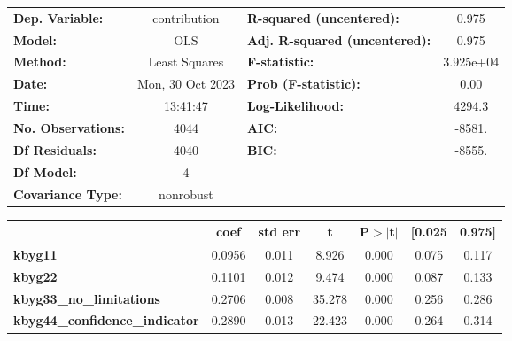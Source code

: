 \begin{center}
\begin{tabular}{lclc}
\toprule
\textbf{Dep. Variable:}                &   contribution   & \textbf{  R-squared (uncentered):}      &     0.975   \\
\textbf{Model:}                        &       OLS        & \textbf{  Adj. R-squared (uncentered):} &     0.975   \\
\textbf{Method:}                       &  Least Squares   & \textbf{  F-statistic:       }          & 3.925e+04   \\
\textbf{Date:}                         & Mon, 30 Oct 2023 & \textbf{  Prob (F-statistic):}          &     0.00    \\
\textbf{Time:}                         &     13:41:47     & \textbf{  Log-Likelihood:    }          &    4294.3   \\
\textbf{No. Observations:}             &        4044      & \textbf{  AIC:               }          &    -8581.   \\
\textbf{Df Residuals:}                 &        4040      & \textbf{  BIC:               }          &    -8555.   \\
\textbf{Df Model:}                     &           4      & \textbf{                     }          &             \\
\textbf{Covariance Type:}              &    nonrobust     & \textbf{                     }          &             \\
\bottomrule
\end{tabular}
\begin{tabular}{lcccccc}
                                       & \textbf{coef} & \textbf{std err} & \textbf{t} & \textbf{P$> |$t$|$} & \textbf{[0.025} & \textbf{0.975]}  \\
\midrule
\textbf{kbyg11}                        &       0.0956  &        0.011     &     8.926  &         0.000        &        0.075    &        0.117     \\
\textbf{kbyg22}                        &       0.1101  &        0.012     &     9.474  &         0.000        &        0.087    &        0.133     \\
\textbf{kbyg33\_no\_limitations}       &       0.2706  &        0.008     &    35.278  &         0.000        &        0.256    &        0.286     \\
\textbf{kbyg44\_confidence\_indicator} &       0.2890  &        0.013     &    22.423  &         0.000        &        0.264    &        0.314     \\

\end{tabular}
\end{center}
